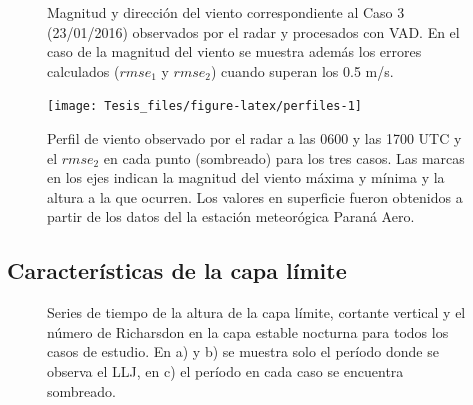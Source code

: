 \documentclass[12pt,spanish,oneside]{book}
\begin{document}
\begin{figure}
\newline{}\caption{Magnitud y dirección del viento  correspondiente al Caso 3 (23/01/2016) observados por el radar y procesados con VAD. En el caso de la magnitud del viento se muestra además los errores calculados ($rmse_1$ y $rmse_2$) cuando superan los 0.5 m/s. \label{campo-caso3}}\label{fig:campo-caso3}
\end{figure}

\begin{figure}

{\centering \texttt{[image: Tesis\_files/figure-latex/perfiles-1]} 

}

\caption{Perfil de viento observado por el radar a las 0600 y las 1700 UTC y el $rmse_2$ en cada punto (sombreado) para los tres casos. Las marcas en los ejes indican la magnitud del viento máxima y mínima y la altura a la que ocurren. Los valores en superficie fueron obtenidos a partir de los datos del la estación meteorógica Paraná Aero. \label{perfiles-horarios}}\label{fig:perfiles}
\end{figure}

\subsection{Características de la capa
límite}\label{caracteristicas-de-la-capa-limite}

\begin{figure}
\newline{}\newline{}\caption{Series de tiempo de la altura de la capa límite, cortante vertical y el número de Richarsdon en la capa estable nocturna para todos los casos de estudio. En a) y b) se muestra solo el período donde se observa el LLJ, en c) el período en cada caso se encuentra sombreado. \label{estable-vad}}\label{fig:estable-vad}
\end{figure}
\end{document}
